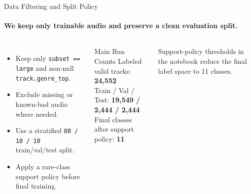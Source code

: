 \documentclass[aspectratio=169,10pt]{beamer}
\newcommand{\smallnote}[1]{{\footnotesize\color{DarkGray}#1}}
\begin{document}
\begin{frame}{Data Filtering and Split Policy}
\framesubtitle{We keep only trainable audio and preserve a clean evaluation split.}
\begin{columns}[T,totalwidth=\textwidth]
\begin{itemize}
  \item Keep only \texttt{subset == large} and non-null \texttt{track.genre\_top}.
  \item Exclude missing or known-bad audio where needed.
  \item Use a stratified \texttt{80 / 10 / 10} train/val/test split.
  \item Apply a rare-class support policy before final training.
\end{itemize}
\vspace{0.2cm}
\begin{block}{Main Run Counts}
\small
Labeled valid tracks: \textbf{24,552}\\
Train / Val / Test: \textbf{19,549 / 2,444 / 2,444}\\
Final classes after support policy: \textbf{11}
\end{block}

\centering
{}
\vspace{0.2cm}

\smallnote{Support-policy thresholds in the notebook reduce the final label space to 11 classes.}
\end{columns}
\end{frame}
\end{document}
